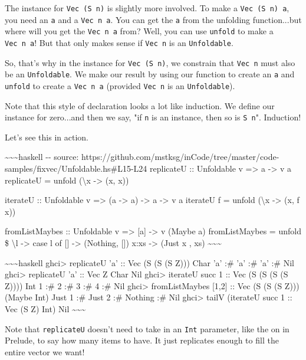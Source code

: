 \documentclass[]{article}
\begin{document}
The instance for \texttt{Vec\ (S\ n)} is slightly more involved. To make a
\texttt{Vec\ (S\ n)\ a}, you need an \texttt{a} and a \texttt{Vec\ n\ a}. You
can get the \texttt{a} from the unfolding function...but where will you get the
\texttt{Vec\ n\ a} from? Well, you can use \texttt{unfold} to make a
\texttt{Vec\ n\ a}! But that only makes sense if \texttt{Vec\ n} is an
\texttt{Unfoldable}.

So, that's why in the instance for \texttt{Vec\ (S\ n)}, we constrain that
\texttt{Vec\ n} must also be an \texttt{Unfoldable}. We make our result by using
our function to create an \texttt{a} and \texttt{unfold} to create a
\texttt{Vec\ n\ a} (provided \texttt{Vec\ n} is an \texttt{Unfoldable}).

Note that this style of declaration looks a lot like induction. We define our
instance for zero...and then we say, "if \texttt{n} is an instance, then so is
\texttt{S\ n}". Induction!

Let's see this in action.

\textasciitilde{}\textasciitilde{}\textasciitilde{}haskell -\/- source:
https://github.com/mstksg/inCode/tree/master/code-samples/fixvec/Unfoldable.hs\#L15-L24
replicateU :: Unfoldable v =\textgreater{} a -\textgreater{} v a replicateU =
unfold (\textbackslash{}x -\textgreater{} (x, x))

iterateU :: Unfoldable v =\textgreater{} (a -\textgreater{} a) -\textgreater{} a
-\textgreater{} v a iterateU f = unfold (\textbackslash{}x -\textgreater{} (x, f
x))

fromListMaybes :: Unfoldable v =\textgreater{} {[}a{]} -\textgreater{} v (Maybe
a) fromListMaybes = unfold \$ \textbackslash{}l -\textgreater{} case l of {[}{]}
-\textgreater{} (Nothing, {[}{]}) x:xs -\textgreater{} (Just x , xs)
\textasciitilde{}\textasciitilde{}\textasciitilde{}

\textasciitilde{}\textasciitilde{}\textasciitilde{}haskell ghci\textgreater{}
replicateU 'a' :: Vec (S (S (S Z))) Char 'a' :\# 'a' :\# 'a' :\# Nil
ghci\textgreater{} replicateU 'a' :: Vec Z Char Nil ghci\textgreater{} iterateU
succ 1 :: Vec (S (S (S (S Z)))) Int 1 :\# 2 :\# 3 :\# 4 :\# Nil
ghci\textgreater{} fromListMaybes {[}1,2{]} :: Vec (S (S (S Z))) (Maybe Int)
Just 1 :\# Just 2 :\# Nothing :\# Nil ghci\textgreater{} tailV (iterateU succ 1
:: Vec (S Z) Int) Nil \textasciitilde{}\textasciitilde{}\textasciitilde{}

Note that \texttt{replicateU} doesn't need to take in an \texttt{Int} parameter,
like the on in Prelude, to say how many items to have. It just replicates enough
to fill the entire vector we want!
\end{document}
